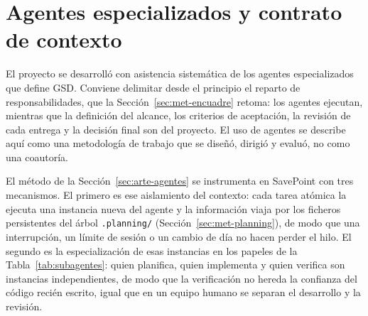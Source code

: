 \section{Agentes especializados y contrato de contexto}\label{sec:met-agentes}\label{sec:met-subagentes}\label{sec:gestion-subagentes}\label{sec:gestion-worktrees}\label{sec:gestion-skills}\label{sec:met-contrato-contexto}\label{sec:gestion-contrato}\label{sec:gestion-memoria}\label{sec:met-ledger}\label{sec:gestion-ledger}\label{sec:met-convenciones}

El proyecto se desarrolló con asistencia sistemática de los agentes especializados que define
GSD. Conviene delimitar desde el principio el reparto de responsabilidades, que la
Sección~\ref{sec:met-encuadre} retoma: los agentes ejecutan, mientras que la definición del
alcance, los criterios de aceptación, la revisión de cada entrega y la decisión final son
del proyecto. El uso de agentes se describe aquí como una metodología de trabajo que se
diseñó, dirigió y evaluó, no como una coautoría.

El método de la Sección~\ref{sec:arte-agentes} se instrumenta en SavePoint con tres mecanismos.
El primero es ese aislamiento del contexto: cada tarea atómica la ejecuta una instancia nueva del
agente y la información viaja por los ficheros persistentes del árbol \texttt{.planning/}
(Sección~\ref{sec:met-planning}), de modo que una interrupción, un límite de sesión o un
cambio de día no hacen perder el hilo. El segundo es la especialización de esas instancias en
los papeles de la Tabla~\ref{tab:subagentes}: quien planifica, quien implementa y quien
verifica son instancias independientes, de modo que la verificación no hereda la confianza
del código recién escrito, igual que en un equipo humano se separan el desarrollo y la
revisión.

